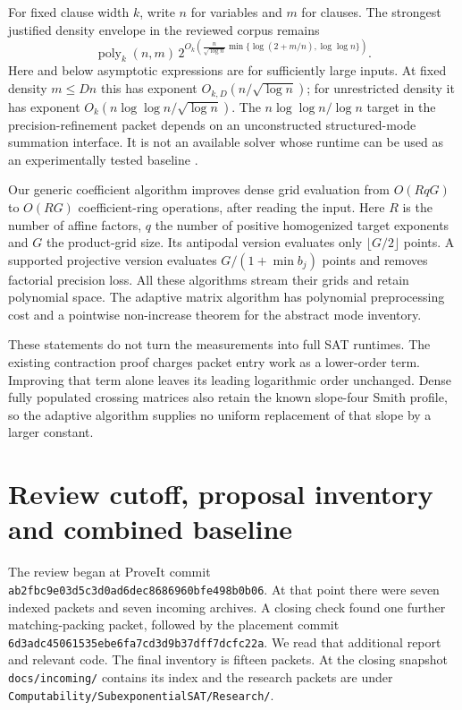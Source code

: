 \documentclass[11pt,letterpaper]{article}
\theoremstyle{definition}\newtheorem{definition}[theorem]{Definition}
\theoremstyle{remark}\newtheorem{remark}[theorem]{Remark}
\newcommand{\poly}{\operatorname{poly}}
\newcommand{\pin}{\nolinkurl{6d3adc45061535ebe6fa7cd3d9b37dff7dcfc22a}}
\begin{document}
For fixed clause width $k$, write $n$ for variables and $m$ for clauses.
The strongest justified density envelope in the reviewed corpus remains
\begin{equation}\label{eq:sat-envelope}
 \poly_k(n,m)\,
 2^{O_k\!\left(\frac{n}{\sqrt{\log n}}
       \min\{\log(2+m/n),\log\log n\}\right)}.
\end{equation}
Here and below asymptotic expressions are for sufficiently large inputs.
At fixed density $m\le Dn$ this has exponent $O_{k,D}(n/\sqrt{\log n})$; for unrestricted
density it has exponent $O_k(n\log\log n/\sqrt{\log n})$.
The $n\log\log n/\log n$ target in the precision-refinement packet depends
on an unconstructed structured-mode summation interface. It is not an
available solver whose runtime can be used as an experimentally tested
baseline \cite{index,precision,density,density2}.

Our generic coefficient algorithm improves dense grid evaluation from
$O(RqG)$ to $O(RG)$ coefficient-ring operations, after reading the input.
Here $R$ is the number of affine factors, $q$ the number of positive
homogenized target exponents and $G$ the product-grid size. Its antipodal
version evaluates only $\lfloor G/2\rfloor$ points. A supported projective
version evaluates $G/(1+\min b_j)$ points and removes factorial precision
loss. All these algorithms stream their grids and retain polynomial space.
The adaptive matrix algorithm has polynomial preprocessing cost and a
pointwise non-increase theorem for the abstract mode inventory.

These statements do not turn the measurements into full SAT runtimes.
The existing contraction proof charges packet entry work as a lower-order
term. Improving that term alone leaves its leading logarithmic order
unchanged. Dense fully populated crossing matrices also retain the known
slope-four Smith profile, so the adaptive algorithm supplies no uniform
replacement of that slope by a larger constant.

\section{Review cutoff, proposal inventory and combined baseline}
\label{sec:review}
The review began at ProveIt commit
\nolinkurl{ab2fbc9e03d5c3d0ad6dec8686960bfe498b0b06}.
At that point there were seven indexed packets and seven incoming archives.
A closing check found one further matching-packing packet, followed by the
placement commit \pin. We read that additional report and relevant code.
The final inventory is fifteen packets. At the closing snapshot
\texttt{docs/incoming/} contains its index and the research packets are
under \texttt{Computability/SubexponentialSAT/Research/}.
\end{document}
